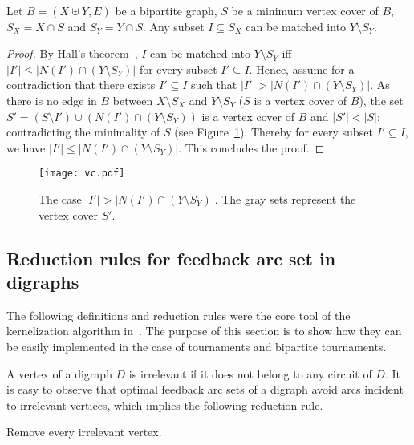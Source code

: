 \begin{lemma} \label{lem:matching}
Let $ B = (X \uplus Y, E)$ be a bipartite graph, $S$ be a minimum vertex cover of $B$, $S_X = X \cap S$ and $S_Y = Y \cap S$. Any subset $I \subseteq S_X$ can be matched into $Y \setminus S_Y$. 
\end{lemma}
\begin{proof}
By Hall's theorem~\cite{H35}, $I$ can be matched into $Y\setminus S_Y$ iff $|I'| \leqslant |N(I') \cap (Y \setminus S_Y)|$ for every subset $I' \subseteq I$. Hence, assume for a contradiction that there exists $I'\subseteq I$ such that $|I'| > |N(I') \cap (Y \setminus S_Y)|$. As there is no edge in $B$ between $X\setminus S_X$ and $Y\setminus S_Y$ ($S$ is a vertex cover of $B$), the set $S'=(S \setminus I') \cup (N(I') \cap (Y \setminus S_Y))$ is a vertex cover of $B$ and $|S'|<|S|$: contradicting the minimality of $S$ (see Figure~\ref{fig:vcrti}). Thereby for every subset $I'\subseteq I$, we have $|I'| \leqslant |N(I') \cap (Y \setminus S_Y)|$. This concludes the proof.  
\end{proof}

\begin{figure}[h]
\begin{center}
\centerline{\texttt{[image: vc.pdf]}}
\caption{The case $|I'| > |N(I') \cap (Y \setminus S_Y)|$. The gray sets represent the vertex cover $S'$.\label{fig:vcrti}}
\end{center}
\end{figure}








\subsection{Reduction rules for feedback arc set in digraphs}

The following definitions and reduction rules were the core tool of the kernelization algorithm in~\cite{BFG+11}. The purpose of this section is to show how they can be easily implemented in the case of tournaments and bipartite tournaments.

A vertex of a digraph $D$ is {irrelevant} if it does not belong to any circuit of $D$. It is easy to observe that  optimal feedback arc sets of a digraph avoid  arcs incident to irrelevant vertices, which implies the following reduction rule.

\begin{polyrule} \label{rule:uselessvertexfast}
Remove every irrelevant vertex.
\end{polyrule}

